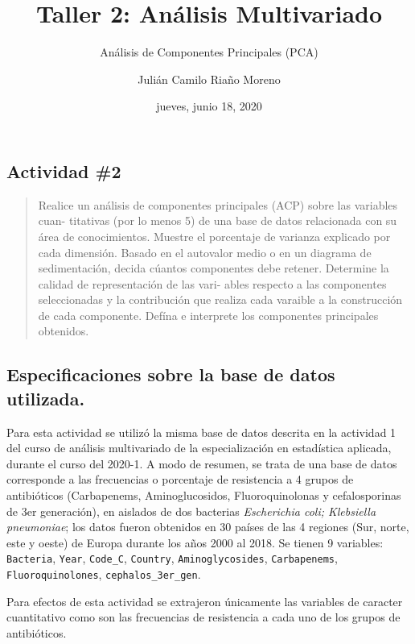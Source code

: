 \documentclass[
]{article}
\title{Taller 2: Análisis Multivariado}
\subtitle{Análisis de Componentes Principales (PCA)}
\author{Julián Camilo Riaño Moreno}
\date{jueves, junio 18, 2020}
\begin{document}
\maketitle

{
\setcounter{tocdepth}{3}
\tableofcontents
}
\hypertarget{actividad-2}{%
\subsection{Actividad \#2}\label{actividad-2}}

\begin{quote}
Realice un análisis de componentes principales (ACP) sobre las variables
cuan- titativas (por lo menos 5) de una base de datos relacionada con su
área de conocimientos. Muestre el porcentaje de varianza explicado por
cada dimensión. Basado en el autovalor medio o en un diagrama de
sedimentación, decida cúantos componentes debe retener. Determine la
calidad de representación de las vari- ables respecto a las componentes
seleccionadas y la contribución que realiza cada varaible a la
construcción de cada componente. Defína e interprete los componentes
principales obtenidos.
\end{quote}

\hypertarget{especificaciones-sobre-la-base-de-datos-utilizada.}{%
\subsection{Especificaciones sobre la base de datos
utilizada.}\label{especificaciones-sobre-la-base-de-datos-utilizada.}}

Para esta actividad se utilizó la misma base de datos descrita en la
actividad 1 del curso de análisis multivariado de la especialización en
estadística aplicada, durante el curso del 2020-1. A modo de resumen, se
trata de una base de datos corresponde a las frecuencias o porcentaje de
resistencia a 4 grupos de antibióticos (Carbapenems, Aminoglucosidos,
Fluoroquinolonas y cefalosporinas de 3er generación), en aislados de dos
bacterias \emph{Escherichia coli; Klebsiella pneumoniae}; los datos
fueron obtenidos en 30 países de las 4 regiones (Sur, norte, este y
oeste) de Europa durante los años 2000 al 2018. Se tienen 9 variables:
\texttt{Bacteria}, \texttt{Year}, \texttt{Code\_C}, \texttt{Country},
\texttt{Aminoglycosides}, \texttt{Carbapenems},
\texttt{Fluoroquinolones}, \texttt{cephalos\_3er\_gen}.

Para efectos de esta actividad se extrajeron únicamente las variables de
caracter cuantitativo como son las frecuencias de resistencia a cada uno
de los grupos de antibióticos.
\end{document}
